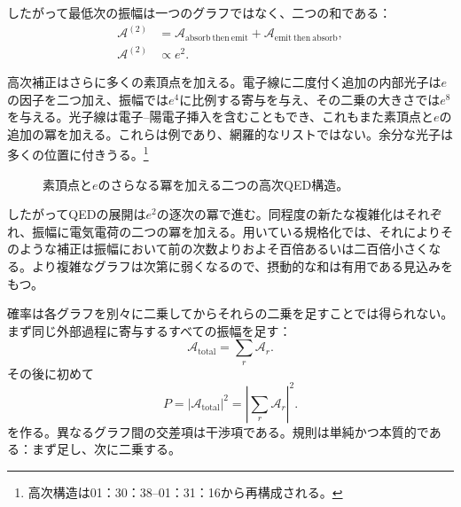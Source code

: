 したがって最低次の振幅は一つのグラフではなく、二つの和である：
\begin{equation}
\begin{aligned}
\mathcal{A}^{(2)}
&=
\mathcal{A}_{\mathrm{absorb\ then\ emit}}
+\mathcal{A}_{\mathrm{emit\ then\ absorb}},\\
\mathcal{A}^{(2)}&\propto e^2.
\end{aligned}
\end{equation}

高次補正はさらに多くの素頂点を加える。電子線に二度付く追加の内部光子は\(e\)の因子を二つ加え、振幅では\(e^4\)に比例する寄与を与え、その二乗の大きさでは\(e^8\)を与える。光子線は電子--陽電子挿入を含むこともでき、これもまた素頂点と\(e\)の追加の冪を加える。これらは例であり、網羅的なリストではない。余分な光子は多くの位置に付きうる。\footnote{高次構造は01：30：38--01：31：16から再構成される。}

\begin{figure}[htbp]
\centering
{}
\caption{素頂点と\(e\)のさらなる冪を加える二つの高次QED構造。}
\end{figure}

したがってQEDの展開は\(e^2\)の逐次の冪で進む。同程度の新たな複雑化はそれぞれ、振幅に電気電荷の二つの冪を加える。用いている規格化では、それによりそのような補正は振幅において前の次数よりおよそ百倍あるいは二百倍小さくなる。より複雑なグラフは次第に弱くなるので、摂動的な和は有用である見込みをもつ。

確率は各グラフを別々に二乗してからそれらの二乗を足すことでは得られない。まず同じ外部過程に寄与するすべての振幅を足す：
\begin{equation}
\mathcal{A}_{\mathrm{total}}=\sum_r\mathcal{A}_r.
\end{equation}
その後に初めて
\begin{equation}
P=\left|\mathcal{A}_{\mathrm{total}}\right|^2
=\left|\sum_r\mathcal{A}_r\right|^2.
\end{equation}
を作る。異なるグラフ間の交差項は干渉項である。規則は単純かつ本質的である：まず足し、次に二乗する。

